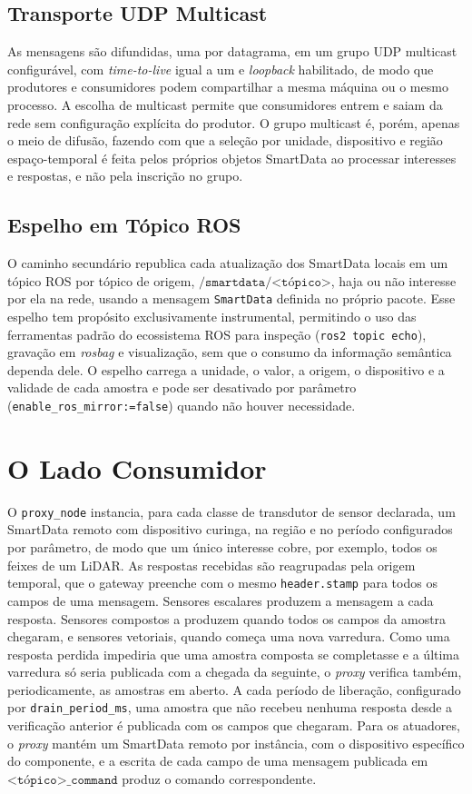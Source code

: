\documentclass[
    12pt,
    oneside,
    a4paper,
    chapter=TITLE,
    section=TITLE,
    english,
    brazil
]{abntex2}
\begin{document}
\subsection{Transporte UDP Multicast}
As mensagens são difundidas, uma por datagrama, em um grupo UDP
multicast configurável, com
\textit{time-to-live} igual a um e \textit{loopback} habilitado, de modo que
produtores e consumidores podem compartilhar a mesma máquina ou o mesmo
processo. A escolha de multicast permite que consumidores entrem e saiam da
rede sem configuração explícita do produtor. O grupo multicast é, porém, apenas
o meio de difusão, fazendo com que a seleção por unidade, dispositivo e região
espaço-temporal é feita pelos próprios objetos SmartData ao processar
interesses e respostas, e não pela inscrição no grupo.

\subsection{Espelho em Tópico ROS}
O caminho secundário republica cada atualização dos SmartData locais em um
tópico ROS por tópico de origem, \(\texttt{/smartdata/<tópico>}\), haja ou não
interesse por ela na rede, usando a mensagem \texttt{SmartData} definida no
próprio pacote. Esse espelho tem propósito exclusivamente instrumental, permitindo
o uso das ferramentas padrão do ecossistema ROS para inspeção (\texttt{ros2
topic echo}), gravação em \textit{rosbag} e visualização, sem que o consumo da
informação semântica dependa dele. O espelho carrega a unidade, o valor, a
origem, o dispositivo e a validade de cada amostra e pode ser desativado por
parâmetro (\texttt{enable\_ros\_mirror:=false}) quando não houver necessidade.

\section{O Lado Consumidor}
\label{sec:proxy}

O \texttt{proxy\_node} instancia, para cada classe de transdutor de
sensor declarada, um SmartData remoto com dispositivo curinga, na região
e no período configurados por parâmetro, de modo que um único interesse
cobre, por exemplo, todos os feixes de um LiDAR. As respostas recebidas
são reagrupadas pela origem temporal, que o gateway preenche com o mesmo
\texttt{header.stamp} para todos os campos de uma mensagem. Sensores
escalares produzem a mensagem a cada resposta. Sensores compostos a
produzem quando todos os campos da amostra chegaram, e sensores
vetoriais, quando começa uma nova varredura. Como uma resposta perdida
impediria que uma amostra composta se completasse e a última varredura
só seria publicada com a chegada da seguinte, o \textit{proxy} verifica
também, periodicamente, as amostras em aberto. A cada período de
liberação, configurado por \texttt{drain\_period\_ms}, uma amostra que
não recebeu nenhuma resposta desde a verificação anterior é publicada
com os campos que chegaram. Para
os atuadores, o \textit{proxy} mantém um SmartData remoto por instância,
com o dispositivo específico do componente, e a escrita de cada campo de
uma mensagem publicada em \(\texttt{<tópico>\_command}\) produz o comando
correspondente.
\end{document}
